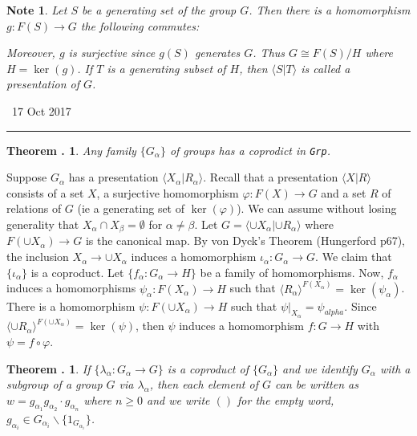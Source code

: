 \documentclass[twoside]{report}
\newcommand{\cat}[1]{\texttt{#1}}
\newcounter{Lecture}
\newcommand{\newLec}[1]{
  \stepcounter{Lecture}
  \noindent{\Large\bf Lecture \arabic{Lecture}} \, #1 \hfill  \rule[1ex]{2.5in}{.1pt} \vspace{1em}
}
\theoremstyle{myts}
\newcounter{c}[Lecture]
\newtheorem{thm}[c]{Theorem \arabic{Lecture}.}
\newtheorem*{nte}{Note}
\newcounter{ex}
\newenvironment{prf}{
  \noindent\begin{mdframed}[style=prf]}{\end{mdframed} \vspace{1em}
}
\begin{document}
\begin{nte}
  Let \(S\) be a generating set of the group $G$. Then there is a homomorphism \(g:F(S) \to G \) the following commutes:
  \begin{center}
  \end{center}
  Moreover, $g$ is surjective since \(g(S)\) generates $G$. Thus \(G\cong F(S)/H\) where \(H= \ker(g) \). If $T$ is a generating subset of $H$, then \( \langle S | T \rangle \) is called a \emph{presentation} of $G$.
\end{nte}

\newLec{17 Oct 2017}

\begin{thm}
  Any family \( \{ G_\alpha \} \) of groups has a coprodict in \cat{Grp}.
\end{thm}

\begin{prf}
  Suppose \(G_\alpha\) has a presentation \(\langle X_\alpha | R_\alpha \rangle \). Recall that a presentation \(\langle X | R \rangle \) consists of a set $X$, a surjective homomorphism \( \varphi : F(X) \to G \) and a set $R$ of relations of $G$ (ie a generating set of \(\ker(\varphi)\)). We can assume without losing generality that \(X_\alpha \cap X_\beta = \emptyset\) for \(\alpha \neq \beta \). Let \( G = \langle \cup X_\alpha | \cup R_\alpha \rangle \) where \( F(\cup X_\alpha ) \to G \) is the canonical map. By von Dyck's Theorem (Hungerford p67), the inclusion \( X_\alpha \to \cup X_\alpha \) induces a homomorphism \(\iota_\alpha : G_\alpha \to G \). We claim that \(\{ \iota_\alpha \}\) is a coproduct. Let \(\{ f_\alpha : G_\alpha \to H \}\) be a family of homomorphisms. Now, \(f_\alpha\) induces a homomorphisms \( \psi_\alpha : F(X_\alpha) \to H \) such that \( \langle R_\alpha \rangle ^{F(X_\alpha)} = \ker(\psi_\alpha) \). There is a homomorphism \( \psi : F(\cup X_\alpha) \to H \) such that \( \psi|_{X_\alpha} = \psi_{alpha} \). Since \( \langle \cup R_\alpha \rangle ^{F(\cup X_\alpha)} = \ker(\psi) \), then \(\psi\) induces a homomorphism \(f:G\to H\) with \( \psi = f\circ \varphi \).
\end{prf}

\begin{thm}
  If \(\{ \lambda_\alpha : G_\alpha \to G \}\) is a coproduct of \(\{G_\alpha\}\) and we identify $G_\alpha$ with a subgroup of a group $G$ via \(\lambda_\alpha\), then each element of $G$ can be written as \( w = g_{\alpha_1} g_{\alpha_2} \cdot g_{\alpha_n} \) where \(n\geq 0\) and we write \( ( ) \) for the empty word, \( g_{\alpha_i} \in G_{\alpha_i}\backslash \{1_{G_{\alpha_i}}\} \).
\end{thm}
\end{document}
